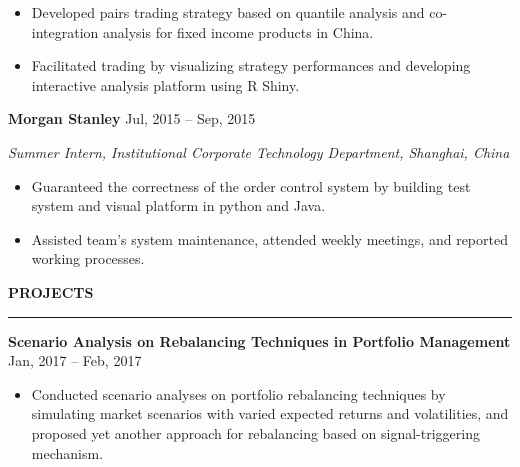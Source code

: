 \documentclass[a4paper,12pt]{report}
\newcommand{\marginAdj}{0.5in}
\begin{document}
\noindent 
\begin{itemize}[noitemsep,topsep=0pt]
\item {\fontsize{10pt}{10pt}\selectfont Developed pairs trading strategy based on quantile analysis and co-integration analysis for fixed income products in China.} \par
\item {\fontsize{10pt}{10pt}\selectfont Facilitated trading by visualizing strategy performances and developing interactive analysis platform using R Shiny.} \par
\end{itemize}
\noindent 
\textbf{Morgan Stanley}{\fontsize{9pt}{9pt}\selectfont  \hspace*{4.4in} \hspace*{\marginAdj} {\fontsize{10pt}{10pt}\selectfont Jul, 2015 – Sep, 2015}} \par
\noindent 
{\fontsize{10pt}{10pt}\selectfont \textit{Summer Intern, Institutional Corporate Technology Department, Shanghai, China}} \par
\noindent 
\begin{itemize}[noitemsep,topsep=0pt]
\item {\fontsize{10pt}{10pt}\selectfont Guaranteed the correctness of the order control system by building test system and visual platform in python and Java.} \par
\noindent 
\item {\fontsize{10pt}{10pt}\selectfont Assisted team’s system maintenance, attended weekly meetings, and reported working processes.} \par
\end{itemize}
 \par
\vspace{9pt}



\noindent 
\textbf{PROJECTS} \par
\vspace{2pt}
\hrule
\vspace{6pt}
\noindent
\textbf{Scenario Analysis on Rebalancing Techniques in Portfolio Management }  \hspace*{\marginAdj}  \hspace*{0.35in} {\fontsize{10pt}{10pt}\selectfont Jan, 2017 – Feb, 2017} \par
\noindent 
\begin{itemize}[noitemsep,topsep=0pt]
	\item {\fontsize{10pt}{10pt}\selectfont Conducted scenario analyses on portfolio rebalancing techniques by simulating market scenarios with varied expected returns and volatilities, and proposed yet another approach for rebalancing based on signal-triggering mechanism.} \par
\end{itemize}
\end{document}
